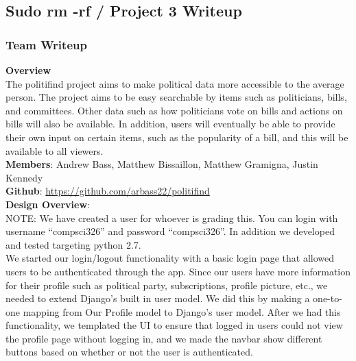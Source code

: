 \documentclass{article}
\newcommand{\n}{\noindent}
\begin{document}
\begin{center}
\subsection*{Sudo rm -rf / Project 3 Writeup}
\end{center}

\subsubsection*{Team Writeup}

\textbf{Overview} \\

The politifind project aims to make political data more accessible to the average person. The project aims to be easy searchable by items such as politicians, bills, and committees. Other data such as how politicians vote on bills and actions on bills will also be available. In addition, users will eventually be able to provide their own input on certain items, such as the popularity of a bill, and this will be available to all viewers. \\

\n\textbf{Members}: Andrew Bass, Matthew Bissaillon, Matthew Gramigna, Justin Kennedy \\

\n\textbf{Github}: \url{https://github.com/arbass22/politifind} \\

\n\textbf{Design Overview}: \\

\n NOTE: We have created a user for whoever is grading this. You can login with username ``compsci326'' and password ``compsci326''.  In addition we developed and tested targeting python 2.7. \\

We started our login/logout functionality with a basic login page that allowed users to be authenticated through the app. Since our users have more information for their profile such as political party, subscriptions, profile picture, etc., we needed to extend Django's built in user model. We did this by making a one-to-one mapping from Our Profile model to Django's user model. After we had this functionality, we templated the UI to ensure that logged in users could not view the profile page without logging in, and we made the navbar show different buttons based on whether or not the user is authenticated.
\end{document}
